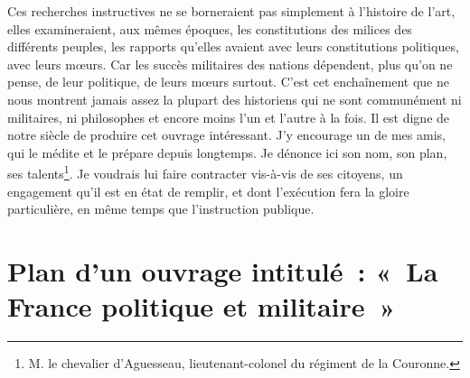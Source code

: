 \documentclass[french,twoside]{book} %
\begin{document}
Ces recherches instructives ne se borneraient pas simplement à l’histoire de l’art, elles examineraient, aux mêmes époques, les constitutions des milices des différents peuples, les rapports qu’elles avaient avec leurs constitutions politiques, avec leurs mœurs. Car les succès militaires des nations dépendent, plus qu’on ne pense, de leur politique, de leurs mœurs surtout. C’est cet enchaînement que ne nous montrent jamais assez la plupart des historiens qui ne sont communément ni militaires, ni philosophes et encore moins l’un et l’autre à la fois. Il est digne de notre siècle de produire cet ouvrage intéressant. J’y encourage un de mes amis, qui le médite et le prépare depuis longtemps. Je dénonce ici son nom, son plan, ses talents\footnote{M. le chevalier d’Aguesseau, lieutenant-colonel du régiment de la Couronne. }. Je voudrais lui faire contracter vis-à-vis de ses citoyens, un engagement qu’il est en état de remplir, et dont l’exécution fera la gloire particulière, en même temps que l’instruction publique.
\section[{Plan d’un ouvrage intitulé : « La France politique et militaire »}]{Plan d’un ouvrage intitulé : « La France politique et militaire »}\renewcommand{\leftmark}{Plan d’un ouvrage intitulé : « La France politique et militaire »}
\end{document}
